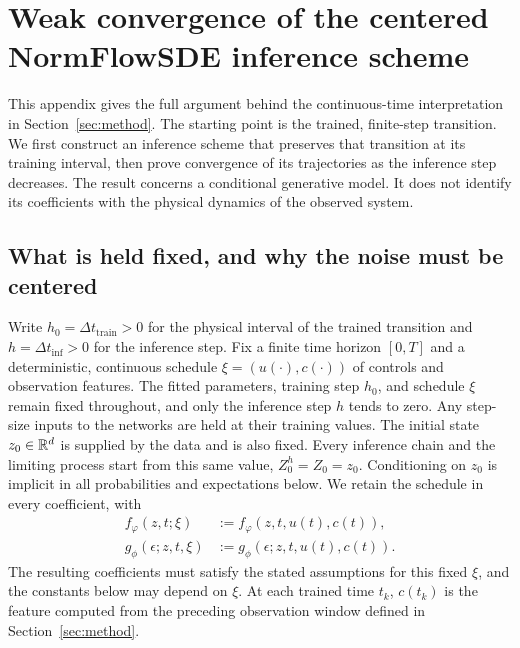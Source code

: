 \section{Weak convergence of the centered NormFlowSDE inference scheme}
\label{app:diffusion}\label{sec:weak_conv_norm_flowsde}

This appendix gives the full argument behind the continuous-time interpretation in Section~\ref{sec:method}. The starting point is the trained, finite-step transition. We first construct an inference scheme that preserves that transition at its training interval, then prove convergence of its trajectories as the inference step decreases. The result concerns a conditional generative model. It does not identify its coefficients with the physical dynamics of the observed system.

\subsection{What is held fixed, and why the noise must be centered}

Write $h_0=\Delta t_{\mathrm{train}}>0$ for the physical interval of the trained transition and $h=\Delta t_{\mathrm{inf}}>0$ for the inference step. Fix a finite time horizon $[0,T]$ and a deterministic, continuous schedule $\xi=(u(\cdot),c(\cdot))$ of controls and observation features. The fitted parameters, training step $h_0$, and schedule $\xi$ remain fixed throughout, and only the inference step $h$ tends to zero. Any step-size inputs to the networks are held at their training values. The initial state $z_0\in\mathbb R^d$ is supplied by the data and is also fixed. Every inference chain and the limiting process start from this same value, $Z_0^h=Z_0=z_0$. Conditioning on $z_0$ is implicit in all probabilities and expectations below. We retain the schedule in every coefficient, with
\begin{align*}
 f_\varphi(z,t;\xi)&:=f_\varphi(z,t,u(t),c(t)),\\
 g_\phi(\epsilon;z,t,\xi)&:=g_\phi(\epsilon;z,t,u(t),c(t)).
\end{align*}
The resulting coefficients must satisfy the stated assumptions for this fixed $\xi$, and the constants below may depend on $\xi$. At each trained time $t_k$, $c(t_k)$ is the feature computed from the preceding observation window defined in Section~\ref{sec:method}. 


